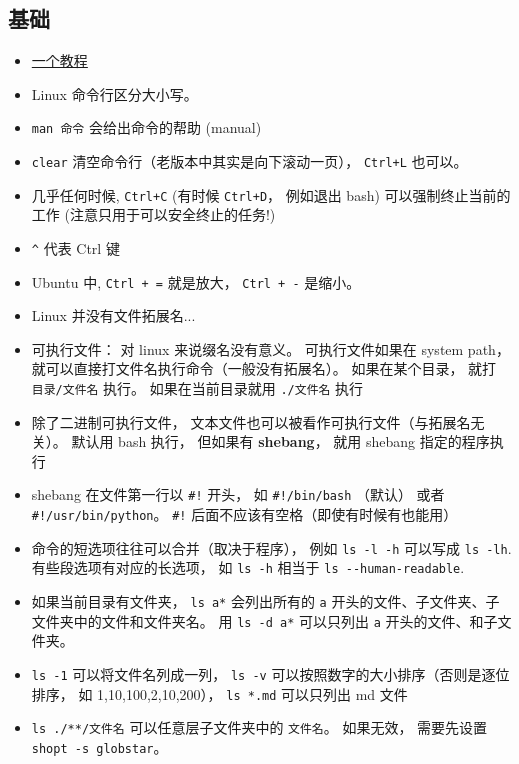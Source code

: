 

\subsection{基础}
\begin{itemize}
\item \href{http://faculty.salina.k-state.edu/tim/unix_sg/index.html}{一个教程}
\item Linux 命令行区分大小写。
\item \verb`man 命令`  会给出命令的帮助 (manual)
\item \verb`clear` 清空命令行（老版本中其实是向下滚动一页）， \verb|Ctrl+L| 也可以。
\item 几乎任何时候, \verb|Ctrl+C| (有时候 \verb|Ctrl+D|， 例如退出 bash) 可以强制终止当前的工作 (注意只用于可以安全终止的任务!)
\item \verb`^` 代表 Ctrl 键
\item Ubuntu 中, \verb|Ctrl + =| 就是放大， \verb|Ctrl + -| 是缩小。
\item Linux 并没有文件拓展名...
\item 可执行文件： 对 linux 来说缀名没有意义。 可执行文件如果在 system path， 就可以直接打文件名执行命令（一般没有拓展名）。 如果在某个目录， 就打 \verb`目录/文件名` 执行。 如果在当前目录就用 \verb`./文件名` 执行
\item 除了二进制可执行文件， 文本文件也可以被看作可执行文件（与拓展名无关）。 默认用 bash 执行， 但如果有 \textbf{shebang}， 就用 shebang 指定的程序执行
\item shebang 在文件第一行以 \verb`#!` 开头， 如 \verb`#!/bin/bash` （默认） 或者 \verb`#!/usr/bin/python`。 \verb|#!| 后面不应该有空格（即使有时候有也能用）
\item 命令的短选项往往可以合并（取决于程序）， 例如 \verb`ls -l -h` 可以写成 \verb`ls -lh`. 有些段选项有对应的长选项， 如 \verb`ls -h` 相当于 \verb`ls --human-readable`.
\item 如果当前目录有文件夹， \verb`ls a*` 会列出所有的 \verb`a` 开头的文件、子文件夹、子文件夹中的文件和文件夹名。 用 \verb`ls -d a*` 可以只列出 \verb`a` 开头的文件、和子文件夹。
\item \verb`ls -1` 可以将文件名列成一列， \verb`ls -v` 可以按照数字的大小排序（否则是逐位排序， 如 1,10,100,2,10,200）， \verb`ls *.md` 可以只列出 md 文件
\item \verb|ls ./**/文件名| 可以任意层子文件夹中的 \verb|文件名|。 如果无效， 需要先设置 \verb|shopt -s globstar|。

\end{itemize}
